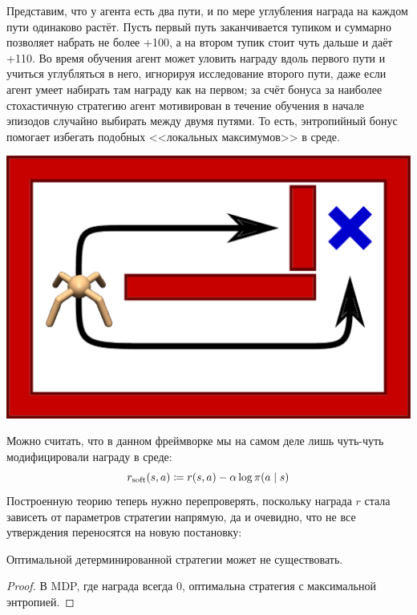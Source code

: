 \begin{exampleBox}[righthand ratio=0.3, sidebyside, sidebyside align=center, lower separated=false]{}
Представим, что у агента есть два пути, и по мере углубления награда на каждом пути одинаково растёт. Пусть первый путь заканчивается тупиком и суммарно позволяет набрать не более +100, а на втором тупик стоит чуть дальше и даёт +110. Во время обучения агент может уловить награду вдоль первого пути и учиться углубляться в него, игнорируя исследование второго пути, даже если агент умеет набирать там награду как на первом; за счёт бонуса за наиболее стохастичную стратегию агент мотивирован в течение обучения в начале эпизодов случайно выбирать между двумя путями. То есть, энтропийный бонус помогает избегать подобных <<локальных максимумов>> в среде.

\tcblower
\includegraphics[width=\textwidth]{Images/twopaths.png}
\end{exampleBox}

Можно считать, что в данном фреймворке мы на самом деле лишь чуть-чуть модифицировали награду в среде:
\begin{equation}\label{softreward}
r_{\mathrm{soft}}(s, a) \coloneqq r(s, a) - \alpha \log \pi(a \mid s)
\end{equation}
Построенную теорию теперь нужно перепроверять, поскольку награда $r$ стала зависеть от параметров стратегии напрямую, да и очевидно, что не все утверждения переносятся на новую постановку:

\begin{theorem}
Оптимальной детерминированной стратегии может не существовать.
\begin{proof}
В MDP, где награда всегда 0, оптимальна стратегия с максимальной энтропией.
\end{proof}
\end{theorem}

